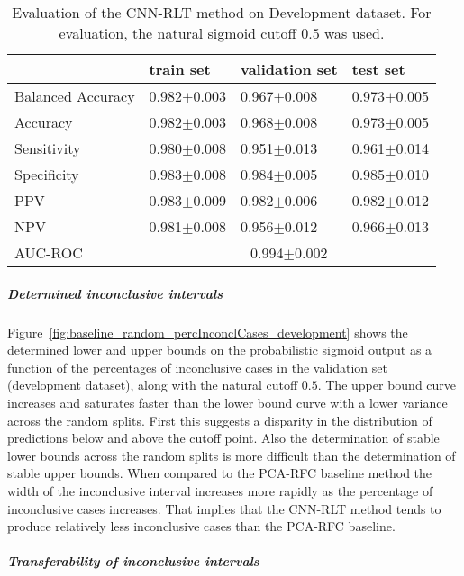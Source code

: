 \begin{table}[ht]
  \caption{Evaluation of the CNN-RLT method on Development dataset. 
  For evaluation, the natural sigmoid cutoff $0.5$ was used.}
  \centering
  \begin{tabular}{llll}
      \hline
                        & train set         & validation set      & test set             \\
      \hline
      Balanced Accuracy & 0.982$\pm$0.003   &  0.967$\pm$0.008    &  0.973$\pm$0.005  \\
      Accuracy          & 0.982$\pm$0.003    &   0.968$\pm$0.008   &  0.973$\pm$0.005  \\
      Sensitivity       &  0.980$\pm$0.008  &   0.951$\pm$0.013  &  0.961$\pm$0.014 \\
      Specificity       &   0.983$\pm$0.008   &   0.984$\pm$0.005  &   0.985$\pm$0.010 \\
      PPV               &  0.983$\pm$0.009   &   0.982$\pm$0.006   &  0.982$\pm$0.012   \\
      NPV               &  0.981$\pm$0.008   &   0.956$\pm$0.012   & 0.966$\pm$0.013  \\
      \hline
      AUC-ROC          &  \multicolumn{3}{c}{0.994$\pm$0.002}  \\
      \hline
  \end{tabular}
 \label{t1:cnn_rlt_perf_eval_table}
\end{table}


\subparagraph{Determined inconclusive intervals}

Figure~\ref{fig:baseline_random_percInconclCases_development} shows the determined lower and upper bounds on the 
probabilistic sigmoid output as a function of the percentages of inconclusive cases 
in the validation set (development dataset), along with the natural cutoff $0.5$.
The upper bound curve increases and saturates faster than the lower bound curve with a lower variance across 
the random splits.
First this suggests a disparity in the distribution of predictions below and above the cutoff point.
Also the determination of stable lower bounds across the random splits is more difficult
than the determination of stable upper bounds.
When compared to the PCA-RFC baseline method 
the width of the inconclusive interval increases more rapidly as the percentage of inconclusive cases increases.
That implies that the CNN-RLT method tends to produce relatively less inconclusive cases than the PCA-RFC baseline.

\subparagraph{Transferability of inconclusive intervals}

